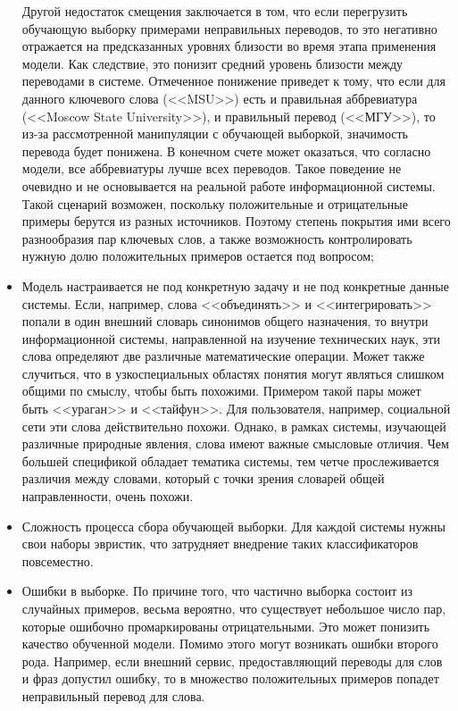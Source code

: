 \begin{itemize}
        Другой недостаток смещения заключается в том, что если перегрузить обучающую выборку примерами неправильных переводов, то это негативно отражается на предсказанных уровнях близости во время этапа применения модели. Как следствие, это понизит средний уровень близости между переводами в системе. Отмеченное понижение приведет к тому, что если для данного ключевого слова (<<MSU>>) есть и правильная аббревиатура (<<Moscow State University>>), и правильный перевод (<<МГУ>>), то из-за рассмотренной манипуляции с обучающей выборкой, значимость перевода будет понижена. В конечном счете может оказаться, что согласно модели, все аббревиатуры лучше всех переводов. Такое поведение не очевидно и не основывается на реальной работе информационной системы. Такой сценарий возможен, поскольку положительные и отрицательные примеры берутся из разных источников. Поэтому степень покрытия ими всего разнообразия пар ключевых слов, а также возможность контролировать нужную долю положительных примеров остается под вопросом;
    \item Модель настраивается не под конкретную задачу и не под конкретные данные системы. Если, например, слова <<объединять>> и <<интегрировать>> попали в один внешний словарь синонимов общего назначения, то внутри информационной системы, направленной на изучение технических наук, эти слова определяют две различные математические операции. Может также случиться, что в узкоспециальных областях понятия могут являться слишком общими по смыслу, чтобы быть похожими. Примером такой пары может быть <<ураган>> и <<тайфун>>. Для пользователя, например, социальной сети эти слова действительно похожи. Однако, в рамках системы, изучающей различные природные явления, слова имеют важные смысловые отличия. Чем большей спецификой обладает тематика системы, тем четче прослеживается различия между словами, который с точки зрения словарей общей направленности, очень похожи.
    \item Сложность процесса сбора обучающей выборки. Для каждой системы нужны свои наборы эвристик, что затрудняет внедрение таких классификаторов повсеместно.
    \item Ошибки в выборке. По причине того, что частично выборка состоит из случайных примеров, весьма вероятно, что существует небольшое число пар, которые ошибочно промаркированы отрицательными. Это может понизить качество обученной модели. Помимо этого могут возникать ошибки второго рода. Например, если внешний сервис, предоставляющий переводы для слов и фраз допустил ошибку, то в множество положительных примеров попадет неправильный перевод для слова.
\end{itemize}

